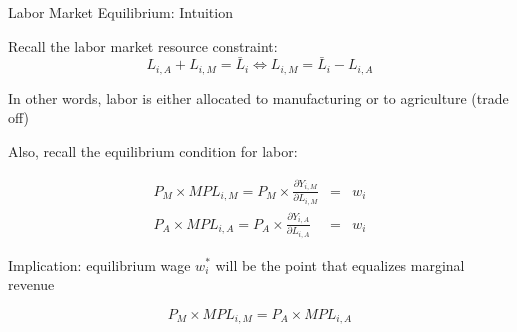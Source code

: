 \documentclass[notes,11pt, aspectratio=169, xcolor=table]{beamer}
\newenvironment{wideitemize}{\itemize\addtolength{\itemsep}{10pt}}{\enditemize}
\begin{document}
\begin{frame}{Labor Market Equilibrium: Intuition}
\begin{wideitemize}
    \item Recall the labor market resource constraint:
        \begin{equation*}
            L_{i,A} + L_{i,M} = \bar{L}_{i} \iff L_{i,M} = \bar{L}_{i} - L_{i,A}  
        \end{equation*}

    \item In other words, labor is either allocated to manufacturing or to agriculture (trade off)

    \item  Also, recall the equilibrium condition for labor:

            \begin{eqnarray*}
            P_M \times MPL_{i,M} = P_M \times  \frac{\partial Y_{i,M}}{\partial L_{i,M}} &=& w_i\\
            P_A \times MPL_{i,A} = P_A \times  \frac{\partial Y_{i,A}}{\partial L_{i,A}} &=& w_i  
        \end{eqnarray*}

    \item Implication: equilibrium wage $w_i^*$ will be the point that equalizes marginal revenue 

    \begin{equation*}
        P_M \times MPL_{i,M}  =  P_A \times MPL_{i,A}
    \end{equation*}

\end{wideitemize}
    
\end{frame}
\end{document}
